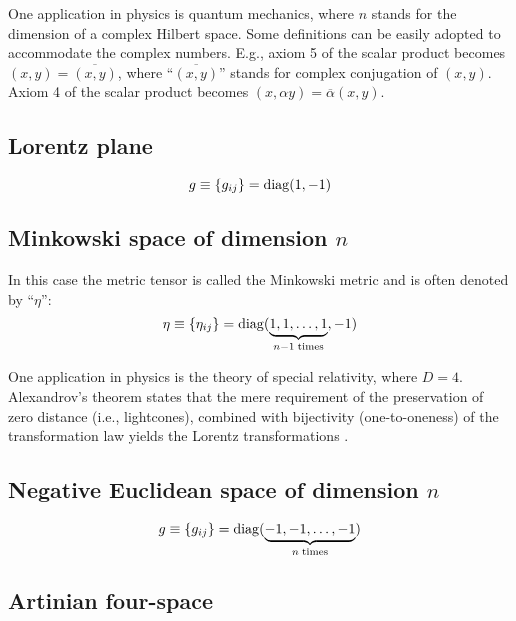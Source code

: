 One application in physics is quantum mechanics,
where $n$ stands for the dimension of a complex Hilbert space.
Some definitions can be easily adopted to accommodate the complex numbers.
E.g., axiom 5 of the scalar product becomes
$(x,y)=\overline{(x,y)}$, where ``$\overline{(x,y)}$'' stands for complex conjugation of $(x,y)$.
Axiom 4 of the scalar product becomes
$(x,\alpha y)=\overline{\alpha} (x,y)$.

\subsection*{Lorentz plane}


\begin{equation}
g\equiv \{g_{ij}\}={\rm diag} (1,-1)
\end{equation}

\subsection*{Minkowski space of dimension $n$}

In this case the metric tensor is called the Minkowski metric and is often denoted by  ``$\eta$'':
\begin{equation}
\eta \equiv \{\eta_{ij}\}={\rm diag} (\underbrace{1,1,\ldots ,1}_{n-1\; {\rm times}},-1)
\end{equation}


One application in physics is the theory of special relativity,
where $D=4$.
Alexandrov's theorem states that the mere requirement of the preservation of
zero distance (i.e., lightcones), combined with bijectivity (one-to-oneness) of the transformation law
yields the Lorentz transformations
\cite{alex1,alex2,alex3,alex-col,borchers-heger,benz,lester,svozil-2001-convention}.



\subsection*{Negative Euclidean space of dimension $n$}

\begin{equation}
g\equiv \{g_{ij}\}={\rm diag} (\underbrace{-1,-1,\ldots ,-1}_{n\; {\rm times}})
\end{equation}

\subsection*{Artinian four-space}

